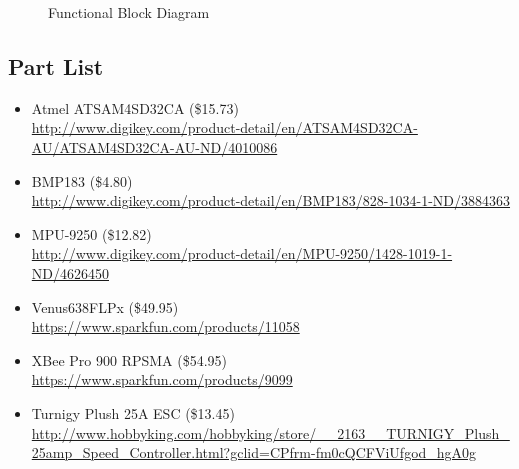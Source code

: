 \documentclass{article}
\begin{document}
\begin{figure}[h]
    \caption{Functional Block Diagram}
\end{figure}

\subsection{Part List}

\begin{itemize}
    \item Atmel ATSAM4SD32CA (\$15.73)\\
    \url{http://www.digikey.com/product-detail/en/ATSAM4SD32CA-AU/ATSAM4SD32CA-AU-ND/4010086}
    \item BMP183 (\$4.80)\\
    \url{http://www.digikey.com/product-detail/en/BMP183/828-1034-1-ND/3884363}
    \item MPU-9250 (\$12.82)\\
    \url{http://www.digikey.com/product-detail/en/MPU-9250/1428-1019-1-ND/4626450}
    \item Venus638FLPx (\$49.95)\\
    \url{https://www.sparkfun.com/products/11058}
    \item XBee Pro 900 RPSMA (\$54.95)\\
    \url{https://www.sparkfun.com/products/9099}
    \item Turnigy Plush 25A ESC (\$13.45)\\
    \url{http://www.hobbyking.com/hobbyking/store/__2163__TURNIGY_Plush_25amp_Speed_Controller.html?gclid=CPfrm-fm0cQCFViUfgod_hgA0g}
\end{itemize}
\end{document}
